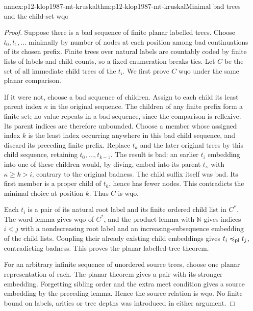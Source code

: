 \begin{annexitem}{annex:p12-klop1987-mt-kruskal}{thm:p12-klop1987-mt-kruskal}{Minimal bad trees and the child-set wqo}
\begin{proof}
Suppose there is a bad sequence of finite planar labelled trees.
Choose \(t_0,t_1,\ldots\) minimally by number of nodes at each
position among bad continuations of its chosen prefix. Finite trees
over natural labels are countably coded by finite lists of labels
and child counts, so a fixed enumeration breaks ties.
Let \(C\) be the set of all immediate child trees of the \(t_i\).
We first prove \(C\) wqo under the same planar comparison.

If it were not, choose a bad sequence of children. Assign to each
child its least parent index \(\kappa\) in the original sequence.
The children of any finite prefix form a finite set; no value repeats
in a bad sequence, since the comparison is reflexive. Its parent
indices are therefore unbounded. Choose a member whose assigned
index \(k\) is the least index occurring anywhere in this bad child
sequence, and discard its preceding finite prefix. Replace \(t_k\)
and the later original trees by this child sequence, retaining
\(t_0,\ldots,t_{k-1}\). The result is bad: an earlier \(t_i\)
embedding into one of these children would, by diving, embed into
its parent \(t_{\kappa}\) with \(\kappa\geq k>i\), contrary
to the original badness. The child suffix itself was bad.
Its first member is a proper child of \(t_k\), hence has fewer
nodes. This contradicts the minimal choice at position \(k\).
Thus \(C\) is wqo.

Each \(t_i\) is a pair of its natural root label and its finite
ordered child list in \(C^*\). The word lemma gives wqo of
\(C^*\), and the product lemma with \(\mathbb N\) gives indices
\(i<j\) with a nondecreasing root label and an increasing-subsequence
embedding of the child lists. Coupling their already existing child
embeddings gives \(t_i\preccurlyeq_{\rm pl}t_j\), contradicting
badness. This proves the planar labelled-tree theorem.

For an arbitrary infinite sequence of unordered source trees, choose
one planar representation of each. The planar theorem gives a pair
with its stronger embedding. Forgetting sibling order and the extra
meet condition gives a source embedding by the preceding lemma.
Hence the source relation is wqo. No finite bound on labels, arities
or tree depths was introduced in either argument.
\end{proof}
\end{annexitem}

